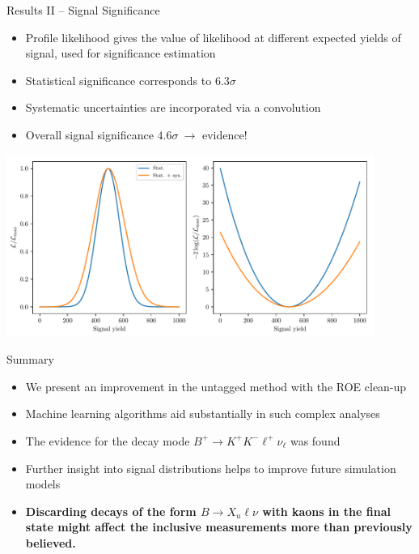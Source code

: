 \documentclass[serif]{beamer}
\begin{document}
\begin{frame}[t]{Results II -- Signal Significance}
\vspace{-3mm}
\small

\begin{itemize}
	\item Profile likelihood gives the value of likelihood at different expected yields of signal, used for significance estimation
	\item Statistical significance corresponds to $6.3\sigma$
	\item Systematic uncertainties are incorporated via a convolution
	\item Overall signal significance $4.6\sigma~\to$ evidence!
\end{itemize}

\vspace{-2mm}

\begin{center}
	\includegraphics[width=0.9\textwidth]{fig/significance}
\end{center}

\end{frame}



\begin{frame}[t]{Summary}
\begin{block}{}
\begin{itemize}
	\item We present an improvement in the untagged method with the ROE clean-up
	\item Machine learning algorithms aid substantially in such complex analyses
	\item The evidence for the decay mode $B^+ \to K^+ K^- \ell^+ \nu_\ell$ was found
	\item Further insight into signal distributions helps to improve future simulation models
	\item \textbf{Discarding decays of the form $B \to X_u \ell \nu$ with kaons in the final state might affect the inclusive measurements more than previously believed.}
\end{itemize}
\end{block}
\end{frame}
\end{document}
